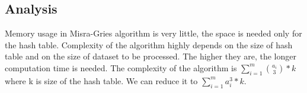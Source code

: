 \label{AnalysisMisraGries}
\subsection{Analysis}
Memory usage in Misra-Gries algorithm is very little, the space is needed only for the hash table. Complexity of the algorithm highly depends on the size of hash table and on the size of dataset to be processed. The higher they are, the longer computation time is needed. The complexity of the algorithm is \(\sum\limits_{i=1}^m{a_i \choose 3}*k\) where k is size of the hash table. We can reduce it to \(\sum\limits_{i=1}^m{a_i^3}*k\).